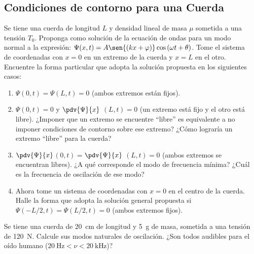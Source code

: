 \subsection*{Condiciones de contorno para una Cuerda}

\item Se tiene una cuerda de longitud $L$ y densidad lineal de masa $\mu$ sometida a una tensión $T_{0}$.
Proponga como solución de la ecuación de ondas para un modo normal a la expresión: $\Psi(x,t)= A \sen{ \left(k x+ \varphi \right ) } \cos{ \left( \omega t + \theta \right) }$.
Tome el sistema de coordenadas con $x=0$ en un extremo de la cuerda y $x=L$ en el otro.
Encuentre la forma particular que adopta la solución propuesta en los siguientes casos: 
\begin{enumerate}
	\item $\Psi(0,t) = \Psi(L,t) = 0$ (ambos extremos están fijos). 
	\item $\Psi(0,t) = 0$ y $\pdv{\Psi}{x}$ $(L,t)= 0$ (un extremo está fijo y el otro está libre).
	¿Imponer que un extremo se encuentre ``libre'' es equivalente a no imponer condiciones de contorno sobre ese extremo?
	¿Cómo lograría un extremo ``libre'' para la cuerda? 
	\item $\pdv{\Psi}{x}$$(0,t)=$$ \pdv{\Psi}{x}$ $(L,t)= 0$ (ambos extremos se encuentran libres).
	¿A qué corresponde el modo de frecuencia mínima?
	¿Cuál es la frecuencia de oscilación de ese modo? 
	\item Ahora tome un sistema de coordenadas con $x=0$ en el centro de la cuerda.
	Halle la forma que adopta la solución general propuesta si $\Psi(-L/2,t)= \Psi(L/2,t)= 0$ (ambos extremos fijos).
\end{enumerate}


\item Se tiene una cuerda de \SI{20}{\centi\metre} de longitud y \SI{5}{\gram} de masa, sometida a una tensión de \SI{120}{\newton}.
Calcule sus modos naturales de oscilación.
¿Son todos audibles para el oído humano (\(\SI{20}{\hertz} < \nu < \SI{20}{\kilo\hertz}\))?


